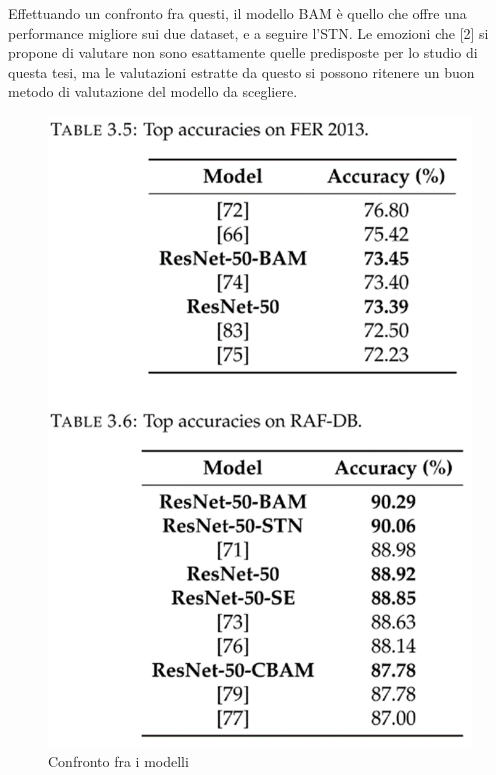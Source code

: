 Effettuando un confronto fra questi, il modello BAM è quello che offre una performance migliore sui due dataset, e a seguire l’STN.
Le emozioni che [2] si propone di valutare non sono esattamente quelle predisposte per lo studio di questa tesi, ma le valutazioni estratte da questo  si possono ritenere un buon metodo di valutazione del modello da scegliere.


    \begin{figure}
        \begin{center}    
            \includegraphics[width=0.4\linewidth]{images/9.png}
            \caption{Confronto fra i modelli}
        \end{center}
    \end{figure}
